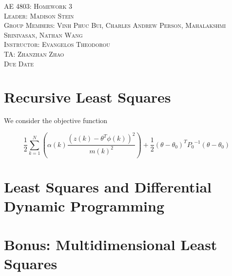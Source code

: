 \documentclass{article}
\begin{document}
\begin{titlepage}
    \center
    \textsc{\LARGE AE 4803: Homework 3}\\[1.5cm]
    \textsc{\Large Leader: Madison Stein}\\[0.5cm]
    \textsc{\Large Group Members: Vinh Phuc Bui, Charles Andrew Person, Mahalakshmi Srinivasan, Nathan Wang}\\[2cm]
    \textsc{\large Instructor: Evangelos Theodorou}\\[0.5cm]
    \textsc{\large TA: Zhanzhan Zhao}\\[1cm]
    \textsc{\large Due Date}
\end{titlepage}

\section{Recursive Least Squares}

We consider the objective function

\begin{equation}
\frac{1}{2} \sum\limits_{k=1}^N (\alpha(k) \frac{(z(k) - \theta^T \phi(k))^2}{m(k)^2}) + \frac{1}{2} (\theta - \theta_0)^T {P_0}^{-1} (\theta - \theta_0)
\end{equation}

\section{Least Squares and Differential Dynamic Programming}

\section{Bonus: Multidimensional Least Squares}
\end{document}
